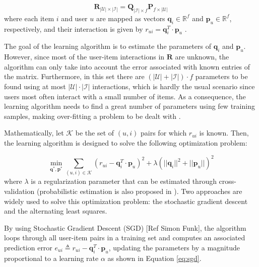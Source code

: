     \begin{equation}
        \label{eq:MF}
        \mathbf{R_{|\mathcal{U}| \times |\mathcal{I}|}} = \mathbf{Q}_{|\mathcal{I}| \times f} \mathbf{P}_{f \times |\mathcal{U}|} 
    \end{equation} where each item $i$ and user $u$ are mapped as vectors $\mathbf{q}_i \in \mathbb{R}^f$ and $\mathbf{p}_u \in \mathbb{R}^f$, respectively, and their interaction is given by $r_{ui} = \mathbf{q}^T_i \cdot \mathbf{p}_u$ \cite{2009MFTechniques}.
    
    The goal of the learning algorithm is to estimate the parameters of  $\mathbf{q}_i$ and $\mathbf{p}_u$. However, since most of the user-item interactions in $\mathbf{R}$ are unknown, the algorithm can only take into account the error associated with known entries of the matrix. Furthermore, in this set there are $(|\mathcal{U}|+|\mathcal{I}|)\cdot f$ parameters to be found using at most $|\mathcal{U}|\cdot |\mathcal{I}|$ interactions, which is hardly the usual scenario since users most often interact with a small number of items. As a consequence, the learning algorithm needs to find a great number of parameters using few training samples, making over-fitting a problem to be dealt with \cite{2008ALSWR}.
    
    Mathematically, let $\mathcal{K}$ be the set of $(u,i)$ pairs for which $r_{ui}$ is known. Then, the learning algorithm is designed to solve the following optimization problem: 
    
    \begin{equation}
        \label{eq:mf_min}
        \min_{\mathbf{q}^*, \mathbf{p}^*} \sum_{(u,i) \in \mathcal{K}} (r_{ui} - \mathbf{q}^T_i \cdot \mathbf{p}_u)^2 + \lambda (||\mathbf{q}_i||^2 + ||\mathbf{p}_u||)^2
    \end{equation} where $\lambda$ is a regularization parameter that can be estimated through cross-validation (probabilistic estimation is also proposed in \cite{2007ProbMF}). Two approaches are widely used to solve this optimization problem: the stochastic gradient descent and the alternating least squares. 
    
    By using Stochastic Gradient Descent (SGD)  [Ref Simon Funk], the algorithm loops through all user-item pairs in a training set and computes an associated prediction error $e_{ui} \triangleq r_{ui} - \mathbf{q}^T_i \cdot \mathbf{p}_u$, updating the parameters by a magnitude proportional to a learning rate $\alpha$ as shown in Equation \ref{eq:sgd}.
    
